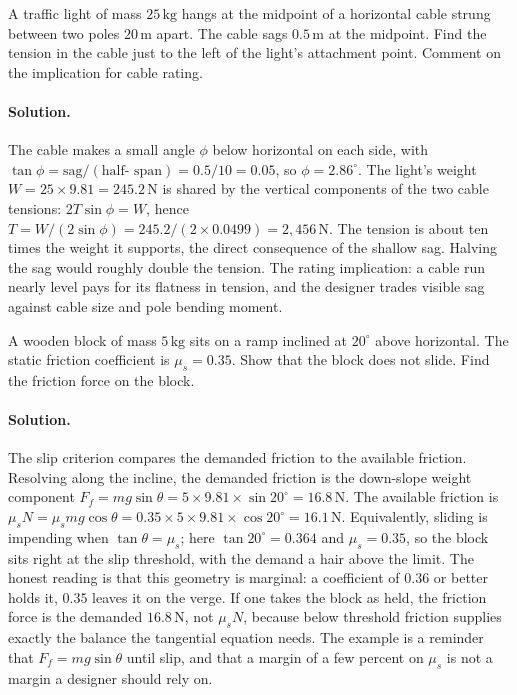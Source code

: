 \begin{exercise}
A traffic light of mass $25\,\si{\kilogram}$ hangs at the midpoint of
a horizontal cable strung between two poles $20\,\si{\meter}$ apart.
The cable sags $0.5\,\si{\meter}$ at the midpoint. Find the tension
in the cable just to the left of the light's attachment point.
Comment on the implication for cable rating.
\paragraph{Solution.} The cable makes a small angle $\phi$ below
horizontal on each side, with $\tan\phi = \text{sag} / (\text{half-
span}) = 0.5 / 10 = 0.05$, so $\phi = 2.86^{\circ}$. The light's weight
$W = 25 \times 9.81 = 245.2\,\text{N}$ is shared by the vertical
components of the two cable tensions: $2T\sin\phi = W$, hence $T = W /
(2\sin\phi) = 245.2 / (2 \times 0.0499) = 2{,}456\,\text{N}$. The
tension is about ten times the weight it supports, the direct
consequence of the shallow sag. Halving the sag would roughly double the
tension. The rating implication: a cable run nearly level pays for its
flatness in tension, and the designer trades visible sag against cable
size and pole bending moment.
\end{exercise}

\begin{exercise}
A wooden block of mass $5\,\si{\kilogram}$ sits on a ramp inclined
at $20^{\circ}$ above horizontal. The static friction coefficient is
$\mu_s = 0.35$. Show that the block does not slide. Find the
friction force on the block.
\paragraph{Solution.} The slip criterion compares the demanded friction
to the available friction. Resolving along the incline, the demanded
friction is the down-slope weight component $F_f = mg\sin\theta = 5
\times 9.81 \times \sin 20^{\circ} = 16.8\,\text{N}$. The available
friction is $\mu_s N = \mu_s mg\cos\theta = 0.35 \times 5 \times 9.81
\times \cos 20^{\circ} = 16.1\,\text{N}$. Equivalently, sliding is
impending when $\tan\theta = \mu_s$; here $\tan 20^{\circ} = 0.364$ and
$\mu_s = 0.35$, so the block sits right at the slip threshold,
with the demand a hair above the limit. The honest reading is that this
geometry is marginal: a coefficient of $0.36$ or better holds it, $0.35$
leaves it on the verge. If one takes the block as held, the friction
force is the demanded $16.8\,\text{N}$, not $\mu_s N$, because below
threshold friction supplies exactly the balance the tangential equation
needs. The example is a reminder that $F_f = mg\sin\theta$ until slip,
and that a margin of a few percent on $\mu_s$ is not a margin a designer
should rely on.
\end{exercise}

